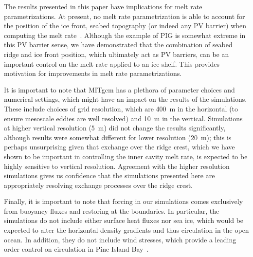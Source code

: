 \documentclass[draft]{agujournal2019}
\begin{document}
The results presented in this paper have implications for melt rate parametrizations. At present, no melt rate parametrization is able to account for the position of the ice front, seabed topography (or indeed any PV barrier) when computing the melt rate~\cite{AsayDavis2017CurrClimChRep, Reese2018Cryo, Bradley2021}. Although the example of PIG is somewhat extreme in this PV barrier sense, we have demonstrated that the combination of seabed ridge and ice front position, which ultimately act as PV barriers, can be an important control on the melt rate applied to an ice shelf. This provides motivation for improvements in melt rate parametrizations. %

It is important to note that MITgcm has a plethora of parameter choices and numerical settings, which might have an impact on the results of the simulations. These include choices of grid resolution, which are 400~m in the horizontal (to ensure mesoscale eddies are well resolved) and 10~m in the vertical. Simulations at higher vertical resolution (5~m) did not change the results significantly, although results were somewhat different for lower resolution (20~m); this is perhaps unsurprising given that exchange over the ridge crest, which we have shown to be important in controlling the inner cavity melt rate, is expected to be highly sensitive to vertical resolution. Agreement with the higher resolution simulations gives us confidence that the simulations presented here are appropriately resolving exchange processes over the ridge crest. 


Finally, it is important to note that forcing in our simulations comes exclusively from buoyancy fluxes and restoring at the boundaries. In particular, the simulations do not include either surface heat fluxes nor sea ice, which would be expected to alter the horizontal density gradients and thus circulation in the open ocean. In addition, they do not include wind stresses, which provide a leading order control on circulation in Pine Island Bay~\cite{Dutrieux2014Science}.
\end{document}

